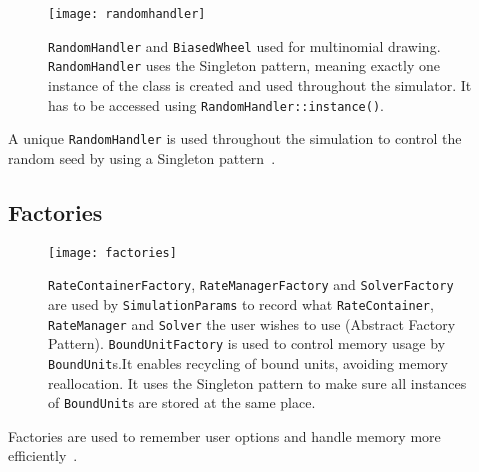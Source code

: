 \begin{figure}[!h]
  \centering
  \texttt{[image: randomhandler]}
  \caption{\texttt{RandomHandler} and \texttt{BiasedWheel} used for multinomial drawing. \texttt{RandomHandler} uses the Singleton pattern, meaning exactly one instance of the class is created and used throughout the simulator. It has to be accessed using \texttt{RandomHandler::instance()}.}
  \label{fig:random_handler}
\end{figure}

A unique \texttt{RandomHandler} is used throughout the simulation to control the random seed by using a Singleton pattern~.

\subsection{Factories}

\begin{figure}[!h]
  \centering
  \texttt{[image: factories]}
  \caption{\texttt{RateContainerFactory}, \texttt{RateManagerFactory} and \texttt{SolverFactory} are used by \texttt{SimulationParams} to record what \texttt{RateContainer}, \texttt{RateManager} and \texttt{Solver} the user wishes to use (Abstract Factory Pattern). \texttt{BoundUnitFactory} is used to control memory usage by \texttt{BoundUnit}s.It enables recycling of bound units, avoiding memory reallocation. It uses the Singleton pattern to make sure all instances of \texttt{BoundUnit}s are stored at the same place.}
  \label{fig:factories}
\end{figure}

Factories are used to remember user options and handle memory more efficiently~.

